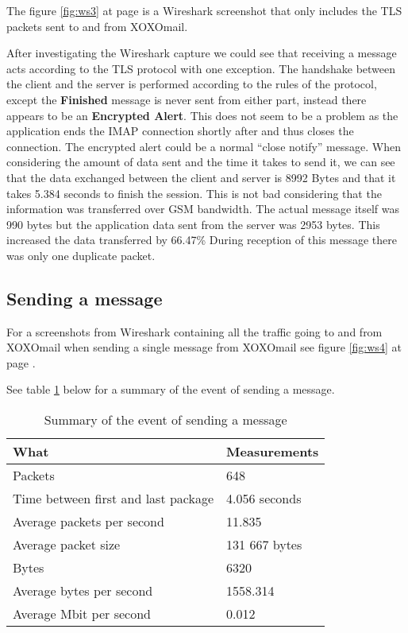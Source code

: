 The figure \ref{fig:ws3} at page \pageref{fig:ws3} is a Wireshark screenshot that only includes the TLS packets sent to and from XOXOmail.

\newpage

After investigating the Wireshark capture we could see that receiving a message acts according to the TLS protocol with one exception. The handshake between the client and the server is performed according to the rules of the protocol, except the \textbf{Finished}  message is never sent from either part, instead there appears to be an \textbf{Encrypted Alert}. This does not seem to be a problem as the application ends the IMAP connection shortly after and thus closes the connection. The encrypted alert could be a normal “close notify” message.
\newline
\newline
When considering the amount of data sent and the time it takes to send it, we can see that the data exchanged between the client and server is 8992 Bytes and that it takes 5.384 seconds to finish the session. This is not bad considering that the information was transferred over GSM bandwidth. The actual message itself was 990 bytes but the application data sent from the server was 2953 bytes. This increased the data transferred by 66.47\% During reception of this message there was only one duplicate packet.

\subsection{Sending a message}

For a screenshots from Wireshark containing all the traffic going to and from XOXOmail when sending a single message from XOXOmail see figure \ref{fig:ws4} at page \pageref{fig:ws4}.

See table \ref{tab:summarysenmes} below for a summary of the event of sending a message.
\begin{table}[h!]
\begin{center}
\begin{tabular}{l|l} \hline
\textbf{What} & \textbf{Measurements} \\ \hline \hline
Packets & 648 \\
Time between first and last package & 4.056 seconds \\
Average packets per second & 11.835 \\
Average packet size & 131 667 bytes \\
Bytes & 6320 \\
Average bytes per second & 1558.314 \\
Average Mbit per second & 0.012 \\ \hline
\end{tabular}
\end{center}
\caption{Summary of the event of sending a message} \label{tab:summarysenmes}
\end{table}


